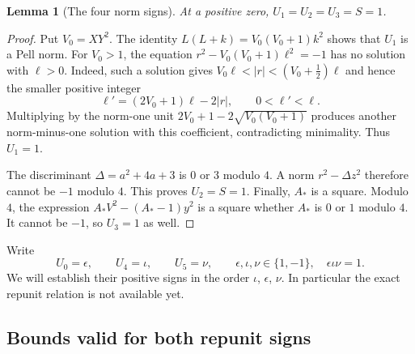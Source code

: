 \documentclass[11pt]{article}
\newtheorem{lemma}[theorem]{Lemma}
\theoremstyle{definition}
\begin{document}
\begin{lemma}[The four norm signs]\label{lem:norm-signs}
At a positive zero, $U_1=U_2=U_3=S=1$.
\end{lemma}

\begin{proof}
Put $V_0=XY^2$. The identity
$L(L+k)=V_0(V_0+1)k^2$ shows that $U_1$ is a Pell norm.
For $V_0>1$, the equation
$r^2-V_0(V_0+1)\ell^2=-1$ has no solution with $\ell>0$.
Indeed, such a solution gives
$V_0\ell<|r|<(V_0+\tfrac12)\ell$ and hence the smaller positive integer
\[
 \ell'=(2V_0+1)\ell-2|r|,\qquad 0<\ell'<\ell.
\]
Multiplying by the norm-one unit
$2V_0+1-2\sqrt{V_0(V_0+1)}$ produces another norm-minus-one solution
with this coefficient, contradicting minimality. Thus $U_1=1$.

The discriminant $\Delta=a^2+4a+3$ is $0$ or $3$ modulo $4$.
A norm $r^2-\Delta z^2$ therefore cannot be $-1$ modulo $4$.
This proves $U_2=S=1$. Finally, $A_*$ is a square. Modulo $4$, the expression
$A_*V^2-(A_*-1)y^2$ is a square whether $A_*$ is $0$ or $1$ modulo $4$.
It cannot be $-1$, so $U_3=1$ as well.
\end{proof}

Write
\[
 U_0=\epsilon,\qquad U_4=\iota,\qquad U_5=\nu,
 \qquad\epsilon,\iota,\nu\in\{1,-1\},\quad
 \epsilon\iota\nu=1.
\]
We will establish their positive signs in the order $\iota$, $\epsilon$,
$\nu$. In particular the exact repunit relation is not available yet.

\subsection{Bounds valid for both repunit signs}
\end{document}
